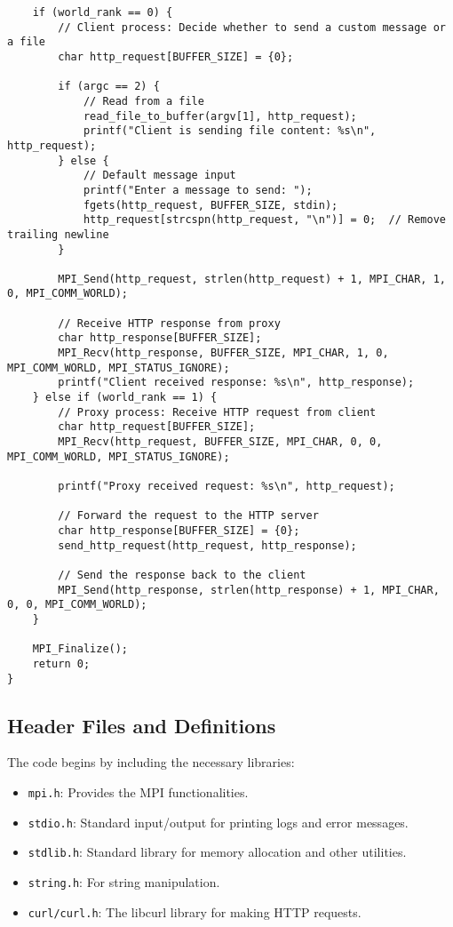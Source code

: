\documentclass[a4paper,12pt]{article}
\begin{document}
\begin{lstlisting}
    if (world_rank == 0) {
        // Client process: Decide whether to send a custom message or a file
        char http_request[BUFFER_SIZE] = {0};
        
        if (argc == 2) {
            // Read from a file
            read_file_to_buffer(argv[1], http_request);
            printf("Client is sending file content: %s\n", http_request);
        } else {
            // Default message input
            printf("Enter a message to send: ");
            fgets(http_request, BUFFER_SIZE, stdin);
            http_request[strcspn(http_request, "\n")] = 0;  // Remove trailing newline
        }

        MPI_Send(http_request, strlen(http_request) + 1, MPI_CHAR, 1, 0, MPI_COMM_WORLD);

        // Receive HTTP response from proxy
        char http_response[BUFFER_SIZE];
        MPI_Recv(http_response, BUFFER_SIZE, MPI_CHAR, 1, 0, MPI_COMM_WORLD, MPI_STATUS_IGNORE);
        printf("Client received response: %s\n", http_response);
    } else if (world_rank == 1) {
        // Proxy process: Receive HTTP request from client
        char http_request[BUFFER_SIZE];
        MPI_Recv(http_request, BUFFER_SIZE, MPI_CHAR, 0, 0, MPI_COMM_WORLD, MPI_STATUS_IGNORE);

        printf("Proxy received request: %s\n", http_request);

        // Forward the request to the HTTP server
        char http_response[BUFFER_SIZE] = {0};
        send_http_request(http_request, http_response);

        // Send the response back to the client
        MPI_Send(http_response, strlen(http_response) + 1, MPI_CHAR, 0, 0, MPI_COMM_WORLD);
    }

    MPI_Finalize();
    return 0;
}
\end{lstlisting}

\subsection{Header Files and Definitions}
The code begins by including the necessary libraries:
\begin{itemize}
    \item \texttt{mpi.h}: Provides the MPI functionalities.
    \item \texttt{stdio.h}: Standard input/output for printing logs and error messages.
    \item \texttt{stdlib.h}: Standard library for memory allocation and other utilities.
    \item \texttt{string.h}: For string manipulation.
    \item \texttt{curl/curl.h}: The libcurl library for making HTTP requests.
\end{itemize}
\end{document}
